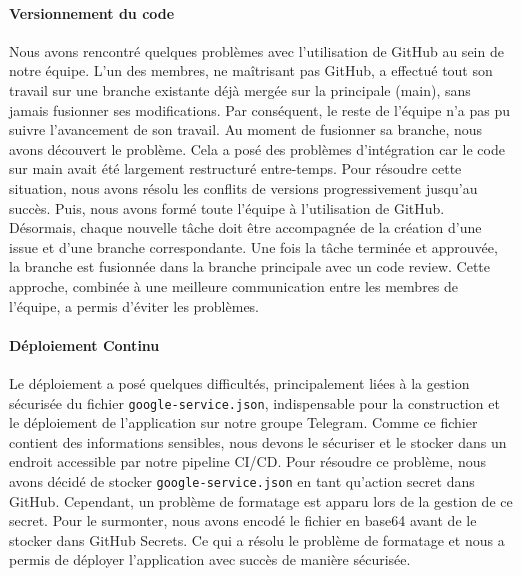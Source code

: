 \paragraph{Versionnement du code} Nous avons rencontré quelques problèmes avec l'utilisation de GitHub au sein de notre équipe. L'un des membres, ne maîtrisant pas GitHub, a effectué tout son travail sur une branche existante déjà mergée sur la principale (main), sans jamais fusionner ses modifications. Par conséquent, le reste de l'équipe n'a pas pu suivre l'avancement de son travail. Au moment de fusionner sa branche, nous avons découvert le problème. Cela a posé des problèmes d'intégration car le code sur main avait été largement restructuré entre-temps. Pour résoudre cette situation, nous avons résolu les conflits de versions progressivement jusqu'au succès. Puis, nous avons formé toute l'équipe à l'utilisation de GitHub. Désormais, chaque nouvelle tâche doit être accompagnée de la création d'une issue et d'une branche correspondante. Une fois la tâche terminée et approuvée, la branche est fusionnée dans la branche principale avec un code review. Cette approche, combinée à une meilleure communication entre les membres de l'équipe, a permis d'éviter les problèmes.

\paragraph{Déploiement Continu} Le déploiement a posé quelques difficultés, principalement liées à la gestion sécurisée du fichier \texttt{google-service.json}, indispensable pour la construction et le déploiement de l'application sur notre groupe Telegram. Comme ce fichier contient des informations sensibles, nous devons le sécuriser et le stocker dans un endroit accessible par notre pipeline CI/CD. Pour résoudre ce problème, nous avons décidé de stocker \texttt{google-service.json} en tant qu'action secret dans GitHub. Cependant, un problème de formatage est apparu lors de la gestion de ce secret. Pour le surmonter, nous avons encodé le fichier en base64 avant de le stocker dans GitHub Secrets. Ce qui a résolu le problème de formatage et nous a permis de déployer l'application avec succès de manière sécurisée.

